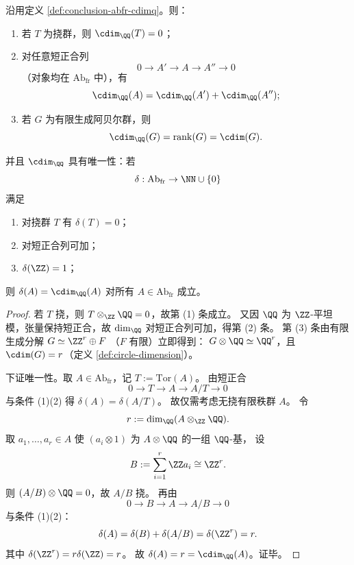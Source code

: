 \begin{proposition}[有理圆维的唯一短正合可加延拓]\label{prop:conclusion-cdimq-unique-exact-extension}
沿用定义 \ref{def:conclusion-abfr-cdimq}。则：
\begin{enumerate}
  \item 若 \(T\) 为挠群，则 \(\cdim_{\QQ}(T)=0\)；
  \item 对任意短正合列
  \[
  0\to A'\to A\to A''\to 0
  \]
  （对象均在 \(\mathrm{Ab}_{\mathrm{fr}}\) 中），有
  \[
  \cdim_{\QQ}(A)=\cdim_{\QQ}(A')+\cdim_{\QQ}(A'');
  \]
  \item 若 \(G\) 为有限生成阿贝尔群，则
  \[
  \cdim_{\QQ}(G)=\operatorname{rank}(G)=\cdim(G).
  \]
\end{enumerate}
并且 \(\cdim_{\QQ}\) 具有唯一性：若
\[
\delta:\mathrm{Ab}_{\mathrm{fr}}\to \NN\cup\{0\}
\]
满足
\begin{enumerate}
  \item 对挠群 \(T\) 有 \(\delta(T)=0\)；
  \item 对短正合列可加；
  \item \(\delta(\ZZ)=1\)；
\end{enumerate}
则 \(\delta(A)=\cdim_{\QQ}(A)\) 对所有 \(A\in\mathrm{Ab}_{\mathrm{fr}}\) 成立。
\end{proposition}
\begin{proof}
若 \(T\) 挠，则 \(T\otimes_{\ZZ}\QQ=0\)，故第 (1) 条成立。
又因 \(\QQ\) 为 \(\ZZ\)-平坦模，张量保持短正合，故
\(\dim_{\QQ}\) 对短正合列可加，得第 (2) 条。
第 (3) 条由有限生成分解
\(
G\simeq \ZZ^r\oplus F
\)
（\(F\) 有限）立即得到：
\(
G\otimes\QQ\simeq \QQ^r
\)，且 \(\cdim(G)=r\)（定义 \ref{def:circle-dimension}）。

下证唯一性。取 \(A\in\mathrm{Ab}_{\mathrm{fr}}\)，记 \(T:=\mathrm{Tor}(A)\)。
由短正合
\[
0\to T\to A\to A/T\to 0
\]
与条件 (1)(2) 得 \(\delta(A)=\delta(A/T)\)。
故仅需考虑无挠有限秩群 \(A\)。
令
\[
r:=\dim_{\QQ}(A\otimes_{\ZZ}\QQ).
\]
取 \(a_1,\dots,a_r\in A\) 使 \((a_i\otimes 1)\) 为 \(A\otimes\QQ\) 的一组 \(\QQ\)-基，
设
\[
B:=\sum_{i=1}^r \ZZ a_i\cong \ZZ^r.
\]
则 \((A/B)\otimes\QQ=0\)，故 \(A/B\) 挠。
再由
\[
0\to B\to A\to A/B\to 0
\]
与条件 (1)(2)：
\[
\delta(A)=\delta(B)+\delta(A/B)=\delta(\ZZ^r)=r.
\]
其中 \(\delta(\ZZ^r)=r\delta(\ZZ)=r\)。
故 \(\delta(A)=r=\cdim_{\QQ}(A)\)。证毕。
\end{proof}

